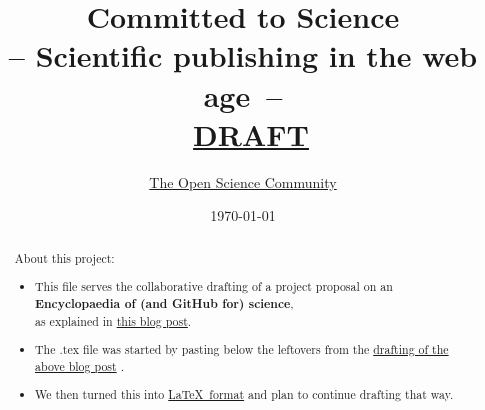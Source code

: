 \documentclass[final,authoryear,3p]{elsarticle-open-drafting}
\begin{document}
\begin{frontmatter}
	\title{{\LARGE \bf Committed to Science}\\-- Scientific publishing in the web age~--\\ \ \href{http://en.wikiversity.org/wiki/User:OpenScientist/Open_grant_writing_-_Encyclopaedia_of_original_research}{DRAFT}}
	\author{\href{https://github.com/Daniel-Mietchen/Open-Research-Proposals/graphs/impact}{The Open Science Community}}




	\date{\today}

	\begin{abstract}
		About this project:
		\begin{itemize}
			\item This file serves the collaborative drafting of a project proposal on an\\ 
			{\bf Encyclopaedia of (and GitHub for) science}, \\	as explained in \href{http://www.science3point0.com/evomri/2011/05/03/drafting-proposals-in-the-open-sketching-out-project-ideas/}{this blog post}. 

			\item The .tex file was started by pasting below the leftovers from the \href{http://species-id.net/w/index.php?title=Draft:Encyclopaedia_of_original_research&oldid=5524}{drafting of the above blog post} . 

			\item We then turned this into \href{http://en.wikibooks.org/wiki/LaTeX}{ \LaTeX~format} and plan to continue drafting that way.


\end{itemize}
\end{abstract}
\end{frontmatter}
\end{document}
